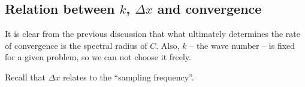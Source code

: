 \documentclass[12pt]{article}
\begin{document}
\begin{multicols}{2}
    \subsection{Relation between $k$, $\Delta x$ and convergence}
    It is clear from the previous discussion that what ultimately determines
    the rate of convergence is the spectral radius of $C$.
    Also, $k$ -- the wave number -- is fixed for a given problem,
    so we can not choose it freely.

    Recall that $\Delta x$ relates to the ``sampling frequency''.


\end{multicols}
\end{document}
